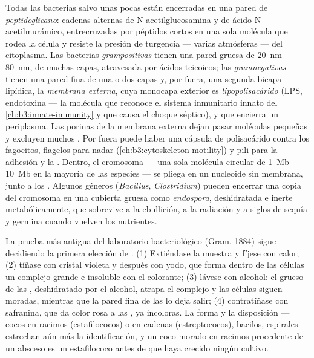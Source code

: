 \begin{definition}[La envoltura]\label{def:b3:bacteriology:envelope}
Todas las bacterias salvo unas pocas están encerradas en una pared de
\emph{peptidoglicano}: cadenas alternas de N-acetilglucosamina y de
ácido N-acetilmurámico, entrecruzadas por péptidos cortos en una sola
molécula que rodea la célula y resiste la presión de turgencia --- varias
atmósferas --- del citoplasma. Las bacterias \emph{grampositivas} tienen
una pared gruesa de \qtyrange{20}{80}{nm}, de muchas capas, atravesada por
ácidos teicoicos; las \emph{gramnegativas} tienen una pared fina de una o
dos capas y, por fuera, una segunda bicapa lipídica, la \emph{membrana
externa}, cuya monocapa exterior es \emph{lipopolisacárido} (LPS,
endotoxina --- la molécula que reconoce el sistema inmunitario innato del
\cref{ch:b3:innate-immunity} y que causa el choque séptico), y que
encierra un periplasma. Las porinas de la membrana externa dejan pasar
moléculas pequeñas y excluyen muchos . Por fuera puede haber
una cápsula de polisacárido contra los fagocitos, flagelos para nadar
(\cref{ch:b3:cytoskeleton-motility}) y pili para la adhesión y la
. Dentro, el cromosoma --- una sola molécula circular de
\qtyrange{1}{10}{Mb} en la mayoría de las especies --- se pliega en un
nucleoide sin membrana, junto a los . Algunos géneros
(\emph{Bacillus}, \emph{Clostridium}) pueden encerrar una copia del
cromosoma en una cubierta gruesa como \emph{endospora}, deshidratada e
inerte metabólicamente, que sobrevive a la ebullición, a la radiación y a
siglos de sequía y germina cuando vuelven los nutrientes.
\end{definition}

\begin{method}\label{met:b3:bacteriology:gram}
La prueba más antigua del laboratorio bacteriológico (Gram, 1884) sigue
decidiendo la primera elección de . (1) Extiéndase la muestra
y fíjese con calor; (2) tíñase con cristal violeta y después con yodo,
que forma dentro de las células un complejo grande e insoluble con el
colorante; (3) lávese con alcohol: el  grueso de las
, deshidratado por el alcohol, atrapa el complejo y las
células siguen moradas, mientras que la pared fina de las 
lo deja salir; (4) contratíñase con safranina, que da color rosa a las
, ya incoloras. La forma y la disposición --- cocos en
racimos (estafilococos) o en cadenas (estreptococos), bacilos, espirales
--- estrechan aún más la identificación, y un coco morado en racimos
procedente de un absceso es un estafilococo antes de que haya crecido
ningún cultivo.
\end{method}

